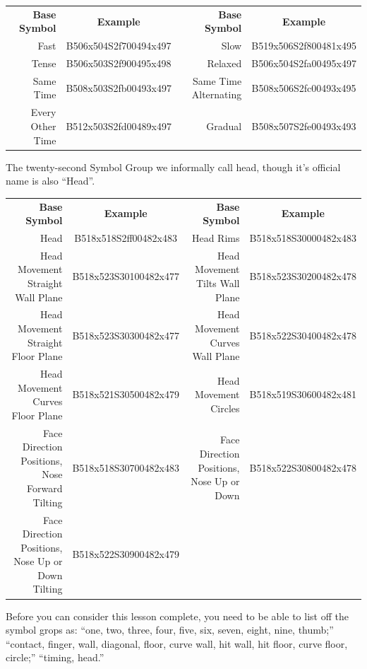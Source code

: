 \documentclass{article}
\begin{document}
\begin{center}
\begin{tabular}{rcrc}
\textbf{Base Symbol}&\textbf{Example}&\textbf{Base Symbol}&\textbf{Example}\\
Fast            &B506x504S2f700494x497&Slow                 &B519x506S2f800481x495\\
Tense           &B506x503S2f900495x498&Relaxed              &B506x504S2fa00495x497\\
Same Time       &B508x503S2fb00493x497&Same Time Alternating&B508x506S2fc00493x495\\
Every Other Time&B512x503S2fd00489x497&Gradual              &B508x507S2fe00493x493\\
\end{tabular}
\end{center}

The twenty-second Symbol Group we informally call head, though it's official name is also ``Head''.

\begin{center}
\begin{tabular}{rcrc}
\textbf{Base Symbol}&\textbf{Example}&\textbf{Base Symbol}&\textbf{Example}\\
Head                                             &B518x518S2ff00482x483&Head Rims                                &B518x518S30000482x483\\
Head Movement Straight Wall Plane                &B518x523S30100482x477&Head Movement Tilts Wall Plane           &B518x523S30200482x478\\
Head Movement Straight Floor Plane               &B518x523S30300482x477&Head Movement Curves Wall Plane          &B518x522S30400482x478\\
Head Movement Curves Floor Plane                 &B518x521S30500482x479&Head Movement Circles                    &B518x519S30600482x481\\
Face Direction Positions, Nose Forward Tilting   &B518x518S30700482x483&Face Direction Positions, Nose Up or Down&B518x522S30800482x478\\
Face Direction Positions, Nose Up or Down Tilting&B518x522S30900482x479\\
\end{tabular}
\end{center}

Before you can consider this lesson complete, you need to be able to list off the symbol grops as:
``one, two, three, four, five, six, seven, eight, nine, thumb;''
``contact, finger, wall, diagonal, floor, curve wall, hit wall, hit floor, curve floor, circle;''
``timing, head.''
\end{document}
